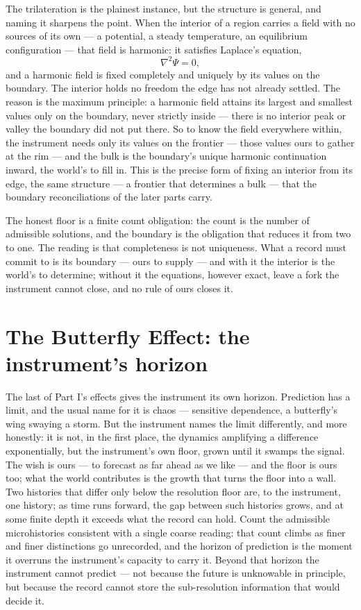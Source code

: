 The trilateration is the plainest instance, but the structure is general, and naming it sharpens the point.
When the interior of a region carries a field with no sources of its own --- a potential, a steady
temperature, an equilibrium configuration --- that field is harmonic: it satisfies Laplace's equation,
\begin{equation}
  \nabla^2 \Psi = 0,
\end{equation}
and a harmonic field is fixed completely and uniquely by its values on the boundary. The interior holds no
freedom the edge has not already settled. The reason is the maximum principle: a harmonic field attains its
largest and smallest values only on the boundary, never strictly inside --- there is no interior peak or
valley the boundary did not put there. So to know the field everywhere within, the instrument needs only its
values on the frontier --- those values ours to gather at the rim --- and the bulk is the boundary's unique
harmonic continuation inward, the world's to fill in. This is the precise form of fixing an interior from its
edge, the same structure --- a frontier that determines a bulk --- that the boundary reconciliations of the
later parts carry.

The honest floor is a finite count obligation: the count is the number of admissible solutions, and the
boundary is the obligation that reduces it from two to one. The reading is that completeness is not
uniqueness. What a record must commit to is its boundary --- ours to supply --- and with it the interior is the
world's to determine; without it the equations, however exact, leave a fork the instrument cannot close, and
no rule of ours closes it.

\section{The Butterfly Effect: the instrument's horizon}
\label{se:butterfly}

The last of Part I's effects gives the instrument its own horizon. Prediction has a limit, and the usual name
for it is chaos --- sensitive dependence, a butterfly's wing swaying a storm. But the instrument names the
limit differently, and more honestly: it is not, in the first place, the dynamics amplifying a difference
exponentially, but the instrument's own floor, grown until it swamps the signal. The wish is ours --- to
forecast as far ahead as we like --- and the floor is ours too; what the world contributes is the growth that
turns the floor into a wall. Two histories that differ only below the resolution floor are, to the instrument,
one history; as time runs forward, the gap between such histories grows, and at some finite depth it exceeds
what the record can hold. Count the admissible microhistories consistent with a
single coarse reading: that count climbs as finer and finer distinctions go unrecorded, and the horizon of
prediction is the moment it overruns the instrument's capacity to carry it. Beyond that horizon the instrument
cannot predict --- not because the future is unknowable in principle, but because the record cannot store the
sub-resolution information that would decide it.

